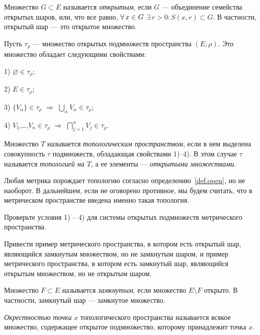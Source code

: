 \documentclass[12pt,titlepage, a4paper]{article}
\begin{document}
\begin{defen}\label{def.open}
Множество $G\subset E$ называется \emph{открытым}, если $G$ ---
объединение семейства открытых шаров, или, что все равно, $\forall\,
x\p\in G$ $\exists\,r>0: S(x,r)\subset G$. В частности, открытый шар
--- это открытое множество.
\end{defen}

Пусть $\tau_\rho$ --- множество открытых подмножеств пространства
$(E,\rho)$. Это множество обладает следующими свойствами:

1) $\varnothing\in \tau_\rho$;

2) $E\in\tau_\rho$;

3) $\{V_\alpha\}\in\tau_\rho$ $\Rightarrow$ $\bigcup\limits_\alpha
V_\alpha\in\tau_\rho$;

4) $V_1$,\ldots,$V_n\in\tau_\rho$ $\Rightarrow$
$\bigcap\limits_{j=1}^nV_j\in\tau_\rho$.

\begin{defen}
Множество $T$ называется \emph{топологическим простра\-нством}, если
в нем выделена совокупность $\tau$ подмножеств, обладающая
свойствами 1)--4). В этом случае $\tau$ называется \emph{топологией
на $T$}, а ее элементы --- \emph{открытыми множествами}.
\end{defen}

\begin{zam}
Любая метрика порождает топологию согласно
определению~\ref{def.open}, но не наоборот. В дальнейшем, если не
оговорено противное, мы будем считать, что в метрическом
пространстве введена именно такая топология.
\end{zam}

\begin{upr}
Проверьте условия 1) -- 4) для системы открытых подмножеств
метрического пространства.
\end{upr}

\begin{upr}
Привести пример метрического пространства, в котором есть открытый
шар, являющийся замкнутым множеством, но не замкнутым шаром, и
пример метрического пространства, в котором есть замкнутый шар,
являющийся открытым множеством, но не открытым шаром.
\end{upr}

\begin{defen}
Множество $F\subset E$ называется \emph{замкнутым}, если множество
$E\setminus F$ открыто. В частности, замкнутый шар --- замкнутое
множество.

\emph{Окрестностью точки} $x$ топологического пространства
называется всякое множество, содержащее открытое подмножество,
которому принадлежит точка $x$.
\end{defen}
\end{document}
